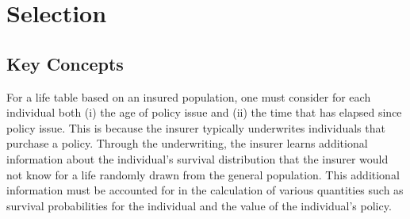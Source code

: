 \documentclass[]{book}
\begin{document}
\chapter{Selection}\label{selection}

\section{Key Concepts}\label{key-concepts}

For a life table based on an insured population, one must consider for
each individual both (i) the age of policy issue and (ii) the time that
has elapsed since policy issue. This is because the insurer typically
underwrites individuals that purchase a policy. Through the
underwriting, the insurer learns additional information about the
individual's survival distribution that the insurer would not know for a
life randomly drawn from the general population. This additional
information must be accounted for in the calculation of various
quantities such as survival probabilities for the individual and the
value of the individual's policy.
\end{document}
